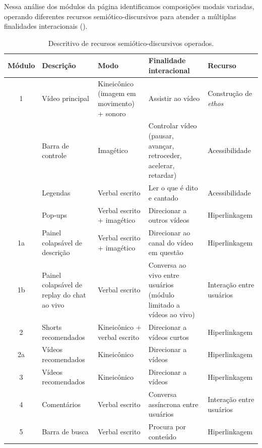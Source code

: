 \documentclass[portuguese]{textolivre}
\begin{document}
Nessa análise dos módulos da página identificamos composições modais variadas, operando diferentes recursos semiótico-discursivos para atender a múltiplas finalidades interacionais ().

\begin{table}[h!]
\centering
\begin{threeparttable}
\caption{Descritivo de recursos semiótico-discursivos operados.}
\label{tab2}

\begin{tabularx}{\textwidth}{
c
>{\raggedright\arraybackslash}X
>{\raggedright\arraybackslash}p{3cm}
>{\raggedright\arraybackslash}p{3.5cm}
>{\raggedright\arraybackslash}p{2.8cm}}
\toprule
Módulo &
Descrição &
Modo &
Finalidade interacional &
Recurso \\
\midrule

1 &
Vídeo principal &
Kineicônico (imagem em movimento) + sonoro &
Assistir ao vídeo &
Construção de \textit{ethos} \\

&
Barra de controle &
Imagético &
Controlar vídeo (pausar, avançar, retroceder, acelerar, retardar) &
Acessibilidade \\

&
Legendas &
Verbal escrito &
Ler o que é dito e cantado &
Acessibilidade \\

&
Pop-ups &
Verbal escrito + imagético &
Direcionar a outros vídeos &
Hiperlinkagem \\

1a &
Painel colapsável de descrição &
Verbal escrito + imagético &
Direcionar ao canal do vídeo em questão &
Hiperlinkagem \\

1b &
Painel colapsável de replay do chat ao vivo &
Verbal escrito &
Conversa ao vivo entre usuários (módulo limitado a vídeos ao vivo) &
Interação entre usuários \\

2 &
Shorts recomendados &
Kineicônico + verbal escrito &
Direcionar a vídeos curtos &
Hiperlinkagem \\

2a &
Vídeos recomendados &
Kineicônico &
Direcionar a vídeos &
Hiperlinkagem \\

3 &
Vídeos recomendados &
Kineicônico &
Direcionar a vídeos &
Hiperlinkagem \\

4 &
Comentários &
Verbal escrito &
Conversa assíncrona entre usuários &
Interação entre usuários \\

5 &
Barra de busca &
Verbal escrito &
Procura por conteúdo &
Hiperlinkagem \\

\bottomrule
\end{tabularx}
\end{threeparttable}
\end{table}
\end{document}
